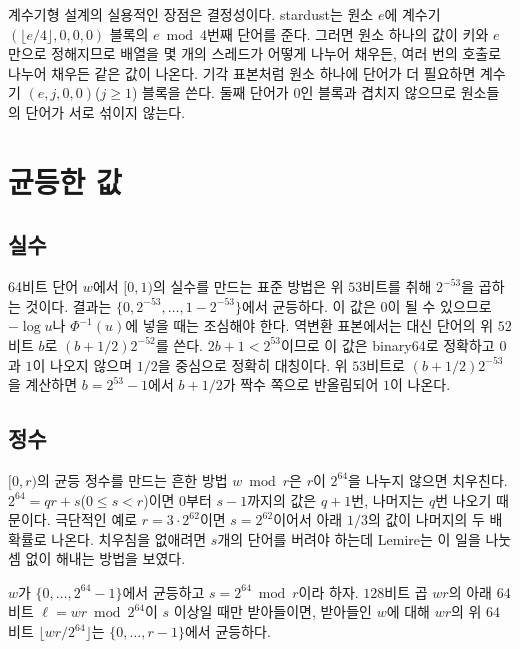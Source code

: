 계수기형 설계의 실용적인 장점은 결정성이다. stardust는 원소 $e$에 계수기 $(\lfloor e/4\rfloor,0,0,0)$ 블록의 $e\bmod4$번째 단어를 준다. 그러면 원소 하나의 값이 키와 $e$만으로 정해지므로 배열을 몇 개의 스레드가 어떻게 나누어 채우든, 여러 번의 호출로 나누어 채우든 같은 값이 나온다. 기각 표본처럼 원소 하나에 단어가 더 필요하면 계수기 $(e,j,0,0)$($j\ge1$) 블록을 쓴다. 둘째 단어가 $0$인 블록과 겹치지 않으므로 원소들의 단어가 서로 섞이지 않는다.

\section{균등한 값}
\label{sec:uniform-values}

\subsection{실수}

64비트 단어 $w$에서 $[0,1)$의 실수를 만드는 표준 방법은 위 $53$비트를 취해 $2^{-53}$을 곱하는 것이다. 결과는 $\{0,2^{-53},\dots,1-2^{-53}\}$에서 균등하다. 이 값은 $0$이 될 수 있으므로 $-\log u$나 $\Phi^{-1}(u)$에 넣을 때는 조심해야 한다. 역변환 표본에서는 대신 단어의 위 $52$비트 $b$로 $(b+1/2)2^{-52}$를 쓴다. $2b+1<2^{53}$이므로 이 값은 binary64로 정확하고 $0$과 $1$이 나오지 않으며 $1/2$을 중심으로 정확히 대칭이다. 위 $53$비트로 $(b+1/2)2^{-53}$을 계산하면 $b=2^{53}-1$에서 $b+1/2$가 짝수 쪽으로 반올림되어 $1$이 나온다.

\subsection{정수}

$[0,r)$의 균등 정수를 만드는 흔한 방법 $w\bmod r$은 $r$이 $2^{64}$을 나누지 않으면 치우친다. $2^{64}=qr+s$($0\le s<r$)이면 $0$부터 $s-1$까지의 값은 $q+1$번, 나머지는 $q$번 나오기 때문이다. 극단적인 예로 $r=3\cdot2^{62}$이면 $s=2^{62}$이어서 아래 $1/3$의 값이 나머지의 두 배 확률로 나온다. 치우침을 없애려면 $s$개의 단어를 버려야 하는데 Lemire는 이 일을 나눗셈 없이 해내는 방법을 보였다\cite{lemire2019interval}.

\begin{proposition}[Lemire]
\label{prop:lemire}
$w$가 $\{0,\dots,2^{64}-1\}$에서 균등하고 $s=2^{64}\bmod r$이라 하자. $128$비트 곱 $wr$의 아래 $64$비트 $\ell=wr\bmod2^{64}$이 $s$ 이상일 때만 받아들이면, 받아들인 $w$에 대해 $wr$의 위 $64$비트 $\lfloor wr/2^{64}\rfloor$는 $\{0,\dots,r-1\}$에서 균등하다.
\end{proposition}

